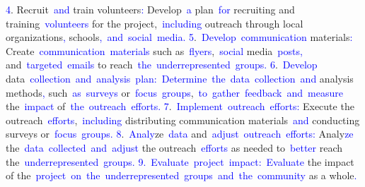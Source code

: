 \documentclass{article}
\begin{document}
\begin{tcolorbox}[colframe=black,colback=white]
\textcolor{blue}{4}. Recruit\textcolor{blue}{~and} train volunteers\textcolor{blue}{:} Develop\textcolor{blue}{~a} plan\textcolor{blue}{~for} recruiting and training\textcolor{blue}{~volunteers} for the project,\textcolor{blue}{~including} outreach through local organizations\textcolor{blue}{,} schools\textcolor{blue}{,}\textcolor{blue}{~and}\textcolor{blue}{~social}\textcolor{blue}{~media}\textcolor{blue}{.
}\textcolor{blue}{5}.\textcolor{blue}{~Develop}\textcolor{blue}{~communication} materials\textcolor{blue}{:} Create\textcolor{blue}{~communication}\textcolor{blue}{~materials} such as\textcolor{blue}{~flyers},\textcolor{blue}{~social} media\textcolor{blue}{~posts}\textcolor{blue}{,} and\textcolor{blue}{~targeted}\textcolor{blue}{~emails} to reach\textcolor{blue}{~the}\textcolor{blue}{~under}\textcolor{blue}{represented}\textcolor{blue}{~groups}\textcolor{blue}{.
}\textcolor{blue}{6}.\textcolor{blue}{~Develop} data\textcolor{blue}{~collection}\textcolor{blue}{~and}\textcolor{blue}{~analysis}\textcolor{blue}{~plan}\textcolor{blue}{:}\textcolor{blue}{~Determine}\textcolor{blue}{~the}\textcolor{blue}{~data}\textcolor{blue}{~collection}\textcolor{blue}{~and} analysis methods\textcolor{blue}{,} such\textcolor{blue}{~as}\textcolor{blue}{~surveys} or\textcolor{blue}{~focus}\textcolor{blue}{~groups},\textcolor{blue}{~to}\textcolor{blue}{~gather}\textcolor{blue}{~feedback}\textcolor{blue}{~and}\textcolor{blue}{~measure} the\textcolor{blue}{~impact} of\textcolor{blue}{~the}\textcolor{blue}{~outreach}\textcolor{blue}{~efforts}\textcolor{blue}{.
}\textcolor{blue}{7}.\textcolor{blue}{~Implement}\textcolor{blue}{~outreach}\textcolor{blue}{~efforts}\textcolor{blue}{:} Execute the outreach\textcolor{blue}{~efforts},\textcolor{blue}{~including} distributing communication materials\textcolor{blue}{~and} conducting surveys or\textcolor{blue}{~focus}\textcolor{blue}{~groups}\textcolor{blue}{.
}\textcolor{blue}{8}.\textcolor{blue}{~Analy}ze\textcolor{blue}{~data} and\textcolor{blue}{~adjust}\textcolor{blue}{~outreach}\textcolor{blue}{~efforts}\textcolor{blue}{:} Analy\textcolor{blue}{ze} the\textcolor{blue}{~data}\textcolor{blue}{~collected}\textcolor{blue}{~and}\textcolor{blue}{~adjust} the outreach\textcolor{blue}{~efforts} as needed to\textcolor{blue}{~better} reach the\textcolor{blue}{~under}\textcolor{blue}{represented}\textcolor{blue}{~groups}\textcolor{blue}{.
}\textcolor{blue}{9}\textcolor{blue}{.}\textcolor{blue}{~Evaluate}\textcolor{blue}{~project}\textcolor{blue}{~impact}\textcolor{blue}{:}\textcolor{blue}{~Evaluate} the impact of the\textcolor{blue}{~project}\textcolor{blue}{~on}\textcolor{blue}{~the}\textcolor{blue}{~under}\textcolor{blue}{represented}\textcolor{blue}{~groups}\textcolor{blue}{~and}\textcolor{blue}{~the}\textcolor{blue}{~community} as a whole\textcolor{blue}{.
}
\end{tcolorbox}
\end{document}

